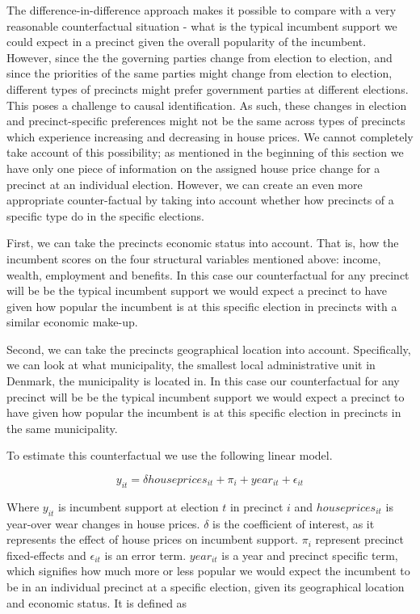 \documentclass[12pt,a4paper]{article}
\begin{document}
The difference-in-difference approach makes it possible to compare with a very reasonable counterfactual situation - what is the typical incumbent support we could expect in a precinct given the overall popularity of the incumbent. However, since the the governing parties change from election to election, and since the priorities of the same parties might change from election to election, different types of precincts might prefer government parties at  different elections. This poses a challenge to causal identification. As such,  these changes in election and precinct-specific preferences might not be the same across types of precincts which experience increasing and decreasing in house prices. We cannot completely take account of this possibility; as mentioned in the beginning of this section we have only one piece of information on the assigned house price change for a precinct at an individual election. However, we can create an even more appropriate counter-factual by taking into account whether how precincts of a specific type do in the specific elections.

First, we can take the precincts economic status into account. That is, how the incumbent scores on the four structural variables mentioned above: income, wealth, employment and benefits. In this case our counterfactual for any precinct will be be the typical incumbent support we would expect a precinct to have given how popular the incumbent is at this specific election in precincts with a similar economic make-up.

Second, we can take the precincts geographical location into account. Specifically, we can look at what municipality,  the smallest local administrative unit in Denmark, the municipality is located in. In this case our counterfactual for any precinct will be be the typical incumbent support we would expect a precinct to have given how popular the incumbent is at this specific election in precincts in the same municipality.

To estimate this counterfactual we use the following linear model.

\begin{equation}
y_{it}= \delta houseprices_{it} + \pi_i + year_{it} + \epsilon_{it}
\end{equation}

Where $y_{it}$ is incumbent support at election $t$ in precinct $i$ and $houseprices_{it}$ is year-over wear changes in house prices. $\delta$ is the coefficient of interest, as it represents the effect of house prices on incumbent support.  $\pi_i$ represent precinct fixed-effects and $\epsilon_{it}$ is an error term. $year_{it}$ is a year and precinct specific term, which signifies how much more or less popular we would expect the incumbent to be in an individual precinct at a specific election, given its geographical location and economic status. It is defined as
\end{document}
